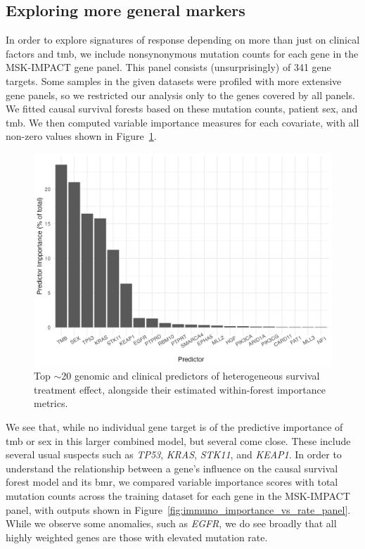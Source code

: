 \documentclass[../thesis.tex]{subfiles}
\begin{document}
\subsection{Exploring more general markers}
In order to explore signatures of response depending on more than just on clinical factors and \gls{tmb}, we include nonsynonymous mutation counts for each gene in the MSK-IMPACT gene panel. This panel consists (unsurprisingly) of 341 gene targets. Some samples in the given datasets were profiled with more extensive gene panels, so we restricted our analysis only to the genes covered by all panels. We fitted causal survival forests based on these mutation counts, patient sex, and \gls{tmb}. We then computed variable importance measures for each covariate, with all non-zero values shown in Figure~\ref{fig:immuno_panel_variable_importance}. 

\begin{figure}[!tpb] 
\centering
\includegraphics[width=\textwidth]{figures/chapter4/immuno_panel_variable_importance.png}
\caption{Top $\sim$20 genomic and clinical predictors of heterogeneous survival treatment effect, alongside their estimated within-forest importance metrics.  \label{fig:immuno_panel_variable_importance}}
\end{figure}

We see that, while no individual gene target is of the predictive importance of \gls{tmb} or sex in this larger combined model, but several come close. These include several usual suspects such as \emph{TP53}, \emph{KRAS}, \emph{STK11}, and \emph{KEAP1}. In order to understand the relationship between a gene's influence on the causal survival forest model and its \gls{bmr}, we compared variable importance scores with total mutation counts across the training dataset for each gene in the MSK-IMPACT panel, with outputs shown in Figure~\ref{fig:immuno_importance_vs_rate_panel}. While we observe some anomalies, such as \emph{EGFR}, we do see broadly that all highly weighted genes are those with elevated mutation rate.
\end{document}
